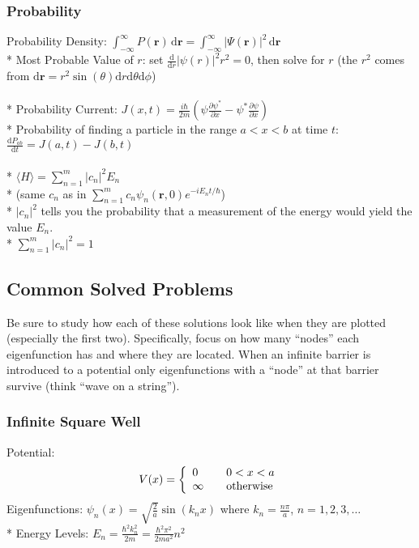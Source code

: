 \subsubsection{Probability}
Probability Density: \(\int_{-\infty}^{\infty} P(\mathbf{r})\,\mathrm{d}\mathbf{r}=\int_{-\infty}^{\infty} |\Psi(\mathbf{r})|^2\,\mathrm{d}\mathbf{r}\)\\*
Most Probable Value of \(r\): set \(\frac{\mathrm{d}}{\mathrm{d}r}|\psi(r)|^2r^2=0\), then solve for \(r\) (the \(r^2\) comes from \(\mathrm{d}\mathbf{r} = r^2\sin(\theta)\mathrm{d}r\mathrm{d}\theta\mathrm{d}\phi\))\\\\*
Probability Current: \(\displaystyle J(x,t)=\frac{i\hbar}{2m}\left(\psi\frac{\partial\psi^*}{\partial x}-\psi^*\frac{\partial\psi}{\partial x}\right)\)\\*
Probability of finding a particle in the range \(a<x<b\) at time \(t\): \(\displaystyle\frac{\mathrm{d}P_{ab}}{\mathrm{d}t}=J(a,t)-J(b,t)\)\\\\*
\(\displaystyle\langle H\rangle=\sum_{n=1}^{m}|c_n|^2E_n\)\\*
(same \(c_n\) as in \(\displaystyle\sum_{n=1}^{m}c_n\psi_n(\mathbf{r},0)e^{-iE_nt/\hbar}\))\\*
\(|c_n|^2\) tells you the probability that a measurement of the energy would yield the value \(E_n\).\\*
\(\displaystyle\sum_{n=1}^{m}|c_n|^2=1\)

\subsection{Common Solved Problems}
Be sure to study how each of these solutions look like when they are plotted (especially the first two).
Specifically, focus on how many ``nodes'' each eigenfunction has and where they are located.
When an infinite barrier is introduced to a potential only eigenfunctions with a ``node'' at that barrier survive (think ``wave on a string'').

\subsubsection{Infinite Square Well}
Potential: \[V(x) = \left\{
\begin{array}{l l}
  0 & \quad \mbox{\(0<x<a\)}\\
  \infty & \quad \mbox{otherwise}\\ \end{array} \right. \]
Eigenfunctions: \(\psi_n(x)=\sqrt{\frac{2}{a}}\sin(k_nx)\) where \(k_n=\frac{n\pi}{a}\), \(n=1,2,3,\ldots\)\\*
Energy Levels: \(\displaystyle E_n=\frac{\hbar^2k_n^2}{2m}=\frac{\hbar^2\pi^2}{2ma^2}n^2\)


